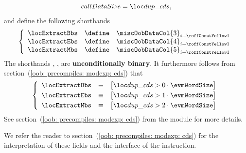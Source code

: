 \begin{description}
\begin{description}
\[{						callDataSize = \locPrcCds                 ,
					}
				\]
				and define the following shorthands
				\[
					\left\{ \begin{array}{lclc}
						\locExtractBbs & \define & \miscOobDataCol {3} _{i + \prcModexpCdsMiscRowOffset} \\
						\locExtractEbs & \define & \miscOobDataCol {4} _{i + \prcModexpCdsMiscRowOffset} \\
						\locExtractMbs & \define & \miscOobDataCol {5} _{i + \prcModexpCdsMiscRowOffset} \\
					\end{array} \right.
				\]
				\saNote{} \label{hub: instruction handling: call: precompiles: modexp: common constraints: extract bbs ebs and mbs OOB shorthands are binary}
				The shorthands
				\locExtractBbs{},
				\locExtractEbs{},
				\locExtractMbs{}
				are \textbf{unconditionally binary}.
				It furthermore follows from
				section~(\ref{oob: precompiles: modexp: cds})
				that
				\[
					\left\{ \begin{array}{lcl}
						\locExtractBbs & \equiv & \big[ \locPrcCds > 0 \cdot \evmWordSize \big] \vspace{1mm} \\
						\locExtractEbs & \equiv & \big[ \locPrcCds > 1 \cdot \evmWordSize \big] \vspace{1mm} \\
						\locExtractMbs & \equiv & \big[ \locPrcCds > 2 \cdot \evmWordSize \big] \\
					\end{array} \right.
				\]
				See section~(\ref{oob: precompiles: modexp: cds})
				from the \oobMod{} module for more details.
		\end{description}
\end{description}
We refer the reader to section~(\ref{oob: precompiles: modexp: cds}) for the interpretation of these fields and the interface of the \oobInstModexpCds{} instruction.


